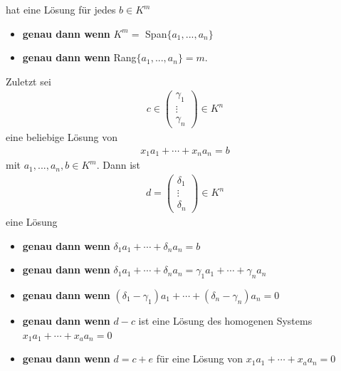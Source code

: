 \documentclass[11pt]{report}
\newcommand*\f[1] {\textbf{#1}}
\begin{document}
hat eine Lösung für jedes $b \in K^m$
\begin{itemize}
 \item \f{genau dann wenn} $K^m =$ Span$\{a_1, ..., a_n\}$
 \item \f{genau dann wenn} Rang$\{a_1, ..., a_n\} = m$.
\end{itemize}
Zuletzt sei
\begin{align}
 c \in \begin{pmatrix} \gamma_1 \\ \vdots \\ \gamma_n\end{pmatrix} \in K^n
\end{align}
eine beliebige Lösung von
\begin{align}
 x_1 a_1 + \cdots + x_n a_n = b
\end{align}
mit $a_1, ..., a_n, b \in K^m$.
Dann ist
\begin{align}
 d = \begin{pmatrix} \delta_1 \\ \vdots \\ \delta_n\end{pmatrix} \in K^n
\end{align}
eine Lösung
\begin{itemize}
 \item \f{genau dann wenn} $\delta_1 a_1 + \cdots + \delta_n a_n = b$
 \item \f{genau dann wenn} $\delta_1 a_1 + \cdots + \delta_n a_n = \gamma_1 a_1 + \cdots +\gamma_n a_n$
 \item \f{genau dann wenn} $(\delta_1-\gamma_1)a_1 + \cdots + (\delta_n - \gamma_n)a_n = 0$
 \item \f{genau dann wenn} $d-c$ ist eine Lösung des homogenen Systems $x_1 a_1+ \cdots + x_a a_n = 0$
 \item \f{genau dann wenn} $d = c + e$ für eine Lösung von $x_1 a_1+ \cdots + x_a a_n = 0$
\end{itemize}
\end{document}
